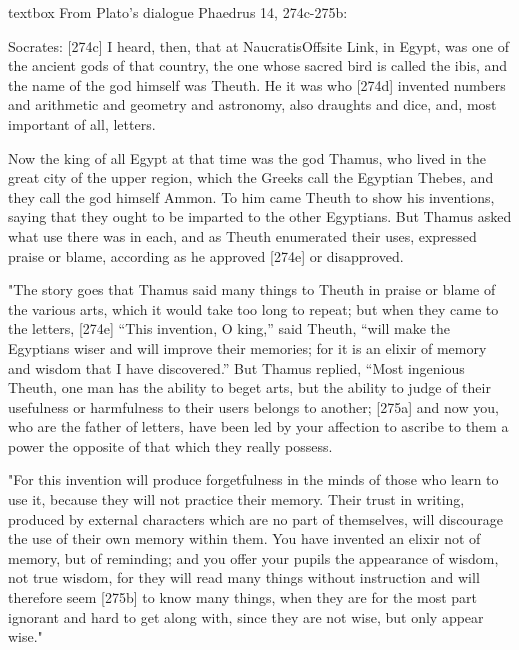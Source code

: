 \begin{table}[b]
\begin{scriptexample}[]{textbox}
From Plato's dialogue Phaedrus 14, 274c-275b:

Socrates: [274c] I heard, then, that at NaucratisOffsite Link, in Egypt, was one of the ancient gods of that country, the one whose sacred bird is called the ibis, and the name of the god himself was Theuth. He it was who [274d] invented numbers and arithmetic and geometry and astronomy, also draughts and dice, and, most important of all, letters. 

Now the king of all Egypt at that time was the god Thamus, who lived in the great city of the upper region, which the Greeks call the Egyptian Thebes, and they call the god himself Ammon. To him came Theuth to show his inventions, saying that they ought to be imparted to the other Egyptians. But Thamus asked what use there was in each, and as Theuth enumerated their uses, expressed praise or blame, according as he approved [274e] or disapproved.  

"The story goes that Thamus said many things to Theuth in praise or blame of the various arts, which it would take too long to repeat; but when they came to the letters, [274e] “This invention, O king,” said Theuth, “will make the Egyptians wiser and will improve their memories; for it is an elixir of memory and wisdom that I have discovered.” But Thamus replied, “Most ingenious Theuth, one man has the ability to beget arts, but the ability to judge of their usefulness or harmfulness to their users belongs to another; [275a] and now you, who are the father of letters, have been led by your affection to ascribe to them a power the opposite of that which they really possess.  

"For this invention will produce forgetfulness in the minds of those who learn to use it, because they will not practice their memory. Their trust in writing, produced by external characters which are no part of themselves, will discourage the use of their own memory within them. You have invented an elixir not of memory, but of reminding; and you offer your pupils the appearance of wisdom, not true wisdom, for they will read many things without instruction and will therefore seem [275b] to know many things, when they are for the most part ignorant and hard to get along with, since they are not wise, but only appear wise." 
\end{scriptexample}
\end{table}


